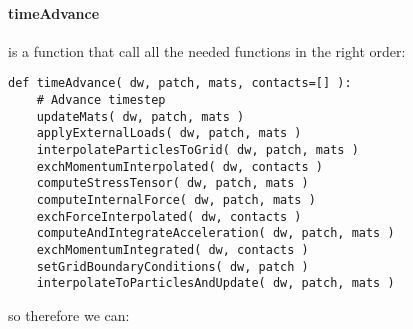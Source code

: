 \paragraph{timeAdvance}
    is a function that call all the needed functions in the right order:
\begin{lstlisting}
def timeAdvance( dw, patch, mats, contacts=[] ):
    # Advance timestep
    updateMats( dw, patch, mats )
    applyExternalLoads( dw, patch, mats )
    interpolateParticlesToGrid( dw, patch, mats )
    exchMomentumInterpolated( dw, contacts )
    computeStressTensor( dw, patch, mats )
    computeInternalForce( dw, patch, mats )
    exchForceInterpolated( dw, contacts )    
    computeAndIntegrateAcceleration( dw, patch, mats )
    exchMomentumIntegrated( dw, contacts )
    setGridBoundaryConditions( dw, patch )
    interpolateToParticlesAndUpdate( dw, patch, mats )
\end{lstlisting}
so therefore we can:
